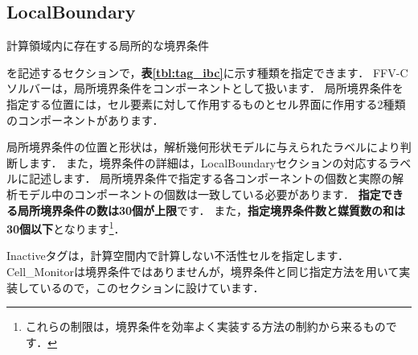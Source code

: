 %
\pagebreak
\subsection{LocalBoundary}

\hypertarget{tgt:localboundary}{計算領域内に存在する局所的な境界条件}を記述するセクションで，\textbf{表\ref{tbl:tag_ibc}}に示す種類を指定できます．
FFV-Cソルバーは，局所境界条件をコンポーネントとして扱います．
局所境界条件を指定する位置には，セル要素に対して作用するものとセル界面に作用する2種類のコンポーネントがあります．

局所境界条件の位置と形状は，解析幾何形状モデルに与えられたラベルにより判断します．
また，境界条件の詳細は，LocalBoundaryセクションの対応するラベルに記述します．
局所境界条件で指定する各コンポーネントの個数と実際の解析モデル中のコンポーネントの個数は一致している必要があります．
\textbf{指定できる局所境界条件の数は30個が上限}です．
また，\textbf{指定境界条件数と媒質数の和は30個以下}となります\footnote{これらの制限は，境界条件を効率よく実装する方法の制約から来るものです．}．

Inactiveタグは，計算空間内で計算しない不活性セルを指定します．
Cell\_Monitorは境界条件ではありませんが，境界条件と同じ指定方法を用いて実装しているので，このセクションに設けています．


